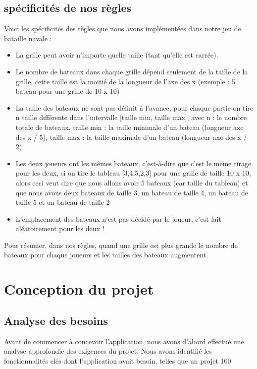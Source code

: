 \documentclass[12pt]{article}
\begin{document}
\subsection{spécificités de nos règles}
Voici les spécificités des règles que nous avons implémentées dans notre jeu de bataille navale :
\begin{itemize}
    \item La grille peut avoir n'importe quelle taille (tant qu'elle est carrée).
    \item Le nombre de bateaux dans chaque grille dépend seulement de la taille de la grille, cette taille est la moitié de la longueur de l'axe des x (exemple : 5 bateau pour une grille de 10 x 10)
    \item La taille des bateaux ne sont pas définit à l'avance, pour chaque partie on tire n taille différente dans l'intervalle [taille min, taille max],
avec n : le nombre totale de bateaux,
	 taille min : la taille minimale d'un bateau (longueur axe des x / 5),
	 taille max : la taille maximale d'un bateau (longueur axe des x / 2).
	\item Les deux joueurs ont les mêmes bateaux, c'est-à-dire que c'est le même tirage pour les deux, si on tire le tableau [3,4,5,2,3] pour une grille de taille 10 x 10, alors ceci veut dire que nous allons avoir 5 bateaux (car taille du tableau) et que nous avons deux bateaux de taille 3, un bateau de taille 4, un bateau de taille 5 et un bateau de taille 2
	
	\item L'emplacement des bateaux n'est pas décidé par le joueur, c'est fait aléatoirement pour les deux !
	
\end{itemize}

Pour résumer, dans nos règles, quand une grille est plus grande le nombre de bateaux pour chaque joueurs et les tailles des bateaux augmentent.
\newpage 

\section{Conception du projet}


\subsection{Analyse des besoins}
Avant de commencer à concevoir l'application, nous avons d'abord effectué une analyse approfondie des exigences du projet. Nous avons identifié les fonctionnalités clés dont l'application avait besoin, telles que un projet 100%
\end{document}
